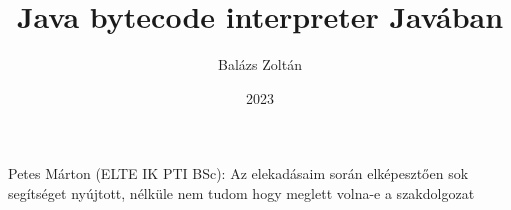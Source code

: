 \documentclass[
]{elteikthesis}[2022/04/30]
\title{Java bytecode interpreter Javában} %
\date{2023} %
\author{Balázs Zoltán}
\affiliation{egyetemi docens} %
\begin{document}


\newcommand{\stagemagic}[1]{\textcolor{brown}{#1}}
\newcommand{\stageminor}[1]{\textcolor{orange}{#1}}
\newcommand{\stagemajor}[1]{\textcolor{red}{#1}}
\newcommand{\stageconstantsize}[1]{\textcolor{green}{#1}}
\newcommand{\stageconstantpool}[1]{\textcolor{teal}{#1}}
\newcommand{\stageaccessflags}[1]{\textcolor{blue}{#1}}
\newcommand{\stagethisclass}[1]{\textcolor{magenta}{#1}}
\newcommand{\stagesuperclass}[1]{\textcolor{violet}{#1}}
\newcommand{\stageinterfacesize}[1]{\textcolor{cyan}{#1}}
\newcommand{\stagefieldsize}[1]{\textcolor{orange}{#1}}
\newcommand{\stagemethodsize}[1]{\textcolor{red}{#1}}
\newcommand{\stagemethods}[1]{\textcolor{purple}{#1}}
\newcommand{\stageattributes}[1]{\textcolor{lime}{#1}}

\maketitle


\tableofcontents
\cleardoublepage{}


\cleardoublepage{}


\cleardoublepage{}


\cleardoublepage{}


\cleardoublepage{}

\chapter*{\acklabel}
Petes Márton (ELTE IK PTI BSc): Az elekadásaim során elképesztően sok segítséget nyújtott, nélküle nem tudom hogy meglett volna-e a szakdolgozat

\appendix

\cleardoublepage{}

\printbibliography[title=\biblabel]
\cleardoublepage{}
\end{document}
